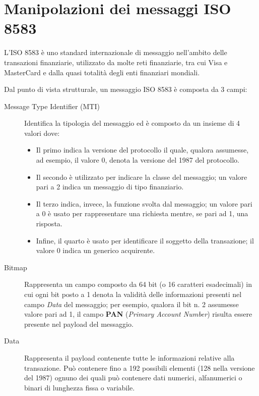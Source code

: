 \documentclass[10pt,a4paper, titlepage]{report}
\begin{document}
\newpage
\section{Manipolazioni dei messaggi ISO 8583}

L'ISO 8583 è uno standard internazionale di messaggio nell'ambito delle transazioni finanziarie, utilizzato da molte reti finanziarie, tra cui Visa e MasterCard e dalla quasi totalità degli enti finanziari mondiali.

Dal punto di vista strutturale, un messaggio ISO 8583 è composta da 3 campi:

\begin{description}
\item[Message Type Identifier (MTI)] Identifica la tipologia del messaggio ed è composto da un insieme di 4 valori dove:

\begin{itemize}
\item Il primo indica la versione del protocollo il quale, qualora assumesse, ad esempio, il valore 0, denota la versione del 1987 del protocollo.
\item Il secondo è utilizzato per indicare la classe del messaggio; un valore pari a 2 indica un messaggio di tipo finanziario.
\item Il terzo indica, invece, la funzione svolta dal messaggio; un valore pari a 0 è usato per rappresentare una richiesta mentre, se pari ad 1, una risposta.
\item Infine, il quarto è usato per identificare il soggetto della transazione; il valore 0 indica un generico acquirente.
\end{itemize}

\item[Bitmap] Rappresenta un campo composto da 64 bit (o 16 caratteri esadecimali) in cui ogni bit posto a 1 denota la validità delle informazioni presenti nel campo \textit{Data} del messaggio; per esempio, qualora il bit n. 2 assumesse valore pari ad 1, il campo \textbf{PAN} (\textit{Primary Account Number}) risulta essere presente nel payload del messaggio.

\item[Data] Rappresenta il payload contenente tutte le informazioni relative alla transazione. Può contenere fino a 192 possibili elementi (128 nella versione del 1987) ognuno dei quali può contenere dati numerici, alfanumerici o binari di lunghezza fissa o variabile.
\end{description}
\end{document}
